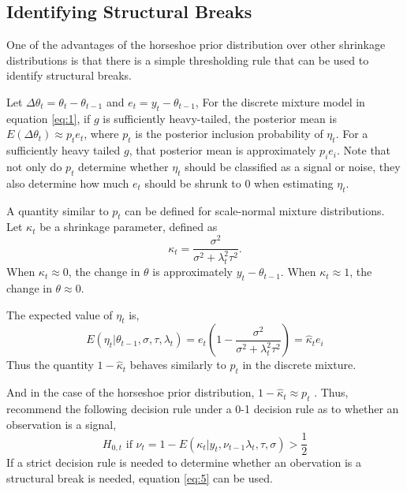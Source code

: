 \documentclass{article}
\begin{document}
\subsection{Identifying Structural Breaks}
\label{sec:ident-struct-breaks}

One of the advantages of the horseshoe prior distribution over other shrinkage distributions is that there is a simple thresholding rule that can be used to identify structural breaks.

Let $\Delta \theta_{t} = \theta_{t} - \theta_{t - 1}$ and $e_{t} = y_{t} - \theta_{t - 1}$, 
For the discrete mixture model in equation \eqref{eq:1}, if $g$ is sufficiently heavy-tailed, the posterior mean is $E(\Delta \theta_{t}) \approx p_{t} e_{t} $, where $p_{t}$ is the posterior inclusion probability of $\eta_{t}$.
For a sufficiently heavy tailed $g$, that posterior mean is approximately $p_{i} e_{i}$.
Note that not only do $p_{t}$ determine whether $\eta_{t}$ should be classified as a signal or noise, they also determine how much $e_{t}$ should be shrunk to 0 when estimating $\eta_{t}$.

A quantity similar to $p_{t}$ can be defined for scale-normal mixture distributions.
Let $\kappa_{t}$ be a shrinkage parameter, defined as
\begin{equation}
  \label{eq:3}
  \kappa_{t} = \frac{\sigma^{2}}{\sigma^{2} + \lambda^{2}_{t} \tau^{2}} \text{.}
\end{equation}
When $\kappa_{t} \approx 0$, the change in $\theta$ is approximately $y_{t} - \theta_{t-1}$.
When $\kappa_{t} \approx 1$, the change in $\theta \approx 0$.

The expected value of $\eta_{t}$ is,
\begin{equation}
  \label{eq:10}
  E(\eta_{t} | \theta_{t - 1}, \sigma, \tau, \lambda_{t}) = e_{t}
  \left(
    1 - \frac{\sigma^{2}}{\sigma^{2} + \lambda^{2}_{t} \tau^{2}}
  \right)  = \hat \kappa_{t} e_{i}
\end{equation}
Thus the quantity $1 - \hat \kappa_{t}$ behaves similarly to $p_{t}$ in the discrete mixture.

And in the case of the horseshoe prior distribution, $1 - \hat \kappa_{t} \approx p_{t}$ \parencite[474]{CarvalhoPolsonScott2010}.
Thus, \textcite{CarvalhoPolsonScott2010} recommend the following  decision rule under a 0-1 decision rule as to whether an observation is a signal,
\begin{equation}
  \label{eq:5}
  \text{$H_{0,t}$ if $\nu_{t} = 1 - E(\kappa_{t}|y_{t}, \nu_{t-1} \lambda_{t}, \tau, \sigma) > \frac{1}{2}$}
\end{equation}
If a strict decision rule is needed to determine whether an obervation is a structural break is needed, equation \eqref{eq:5} can be used.
\end{document}
